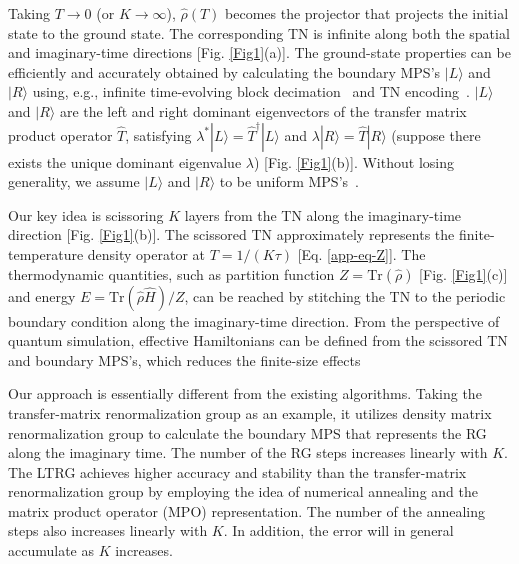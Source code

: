 \documentclass[aps,prl,twocolumn,superscriptaddress,a4paper,english,longbibliography]{revtex4-1}
\begin{document}
Taking $T \to 0$ (or $K \to \infty$), $\hat{\rho}(T)$ becomes the projector that projects the initial state to the ground state. The corresponding TN is infinite along both the spatial and imaginary-time directions [Fig. \ref{Fig1}(a)]. The ground-state properties can be efficiently and accurately obtained by calculating the boundary MPS's $|L\rangle$ and $|R\rangle$ using, e.g., infinite time-evolving block decimation~\cite{PhysRevLett.98.070201} and TN encoding~\cite{PhysRevE.93.053310}. $|L\rangle$ and $|R\rangle$ are the left and right dominant eigenvectors of the transfer matrix product operator $\hat{T}$, satisfying $\lambda^{\ast} |L\rangle = \hat{T}^{\dagger} |L\rangle$ and $\lambda  |R\rangle = \hat{T} |R\rangle$ (suppose there exists the unique dominant eigenvalue $\lambda$) [Fig. \ref{Fig1}(b)].  Without losing generality, we assume $|L\rangle$ and $|R\rangle$ to be uniform MPS's~\cite{1992CMaPh.144..443F}. 

Our key idea is scissoring $K$ layers from the TN along the imaginary-time direction [Fig. \ref{Fig1}(b)]. The scissored TN approximately represents the finite-temperature density operator at $T=1/(K\tau)$ [Eq. \ref{app-eq-Z}]. The thermodynamic quantities, such as partition function $Z = \text{Tr}(\hat{\rho})$ [Fig. \ref{Fig1}(c)] and energy $E = \text{Tr}(\hat{\rho} \hat{H}) / Z$, can be reached by stitching the TN to the periodic boundary condition along the imaginary-time direction. From the perspective of quantum simulation, effective Hamiltonians can be defined from the scissored TN and boundary MPS's, which reduces the finite-size effects~\cite{PhysRevB.99.205132}

Our approach is essentially different from the existing algorithms. Taking the transfer-matrix renormalization group as an example, it utilizes density matrix renormalization group to calculate the boundary MPS that represents the RG along the imaginary time. The number of the RG steps increases linearly with $K$. The LTRG achieves higher accuracy and stability than the transfer-matrix renormalization group by employing the idea of numerical annealing and the matrix product operator (MPO) representation. The number of the annealing steps also increases linearly with $K$. In addition, the error will in general accumulate as $K$ increases.
\end{document}
